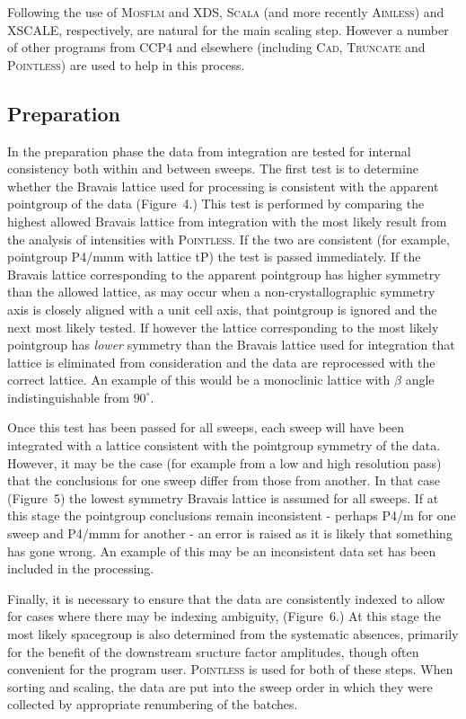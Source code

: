 \documentclass[preprint,pdf]{iucr}
\begin{document}
Following the use of \textsc{Mosflm} and XDS, \textsc{Scala} 
(and more recently \textsc{Aimless}) and
XSCALE, respectively, 
are natural for the main scaling step. However a number of other
programs from CCP4 and elsewhere (including \textsc{Cad}, 
\textsc{Truncate} and
\textsc{Pointless}) are used to help in this process.

\subsection{Preparation}

In the preparation phase the data from integration are tested for
internal consistency both within and between sweeps. The first test is
to determine whether the Bravais lattice used for processing is
consistent with the apparent pointgroup of the data
(Figure~4.)
This test is performed by comparing the highest allowed Bravais
lattice from integration with the most likely result from 
the analysis of intensities with \textsc{Pointless}. If
the two are consistent (for example, pointgroup P4/mmm with lattice tP)
the test is passed immediately. If the Bravais lattice corresponding
to the apparent pointgroup has higher
symmetry than the allowed lattice, as may occur when a
non-crystallographic symmetry axis is closely aligned with a unit cell
axis, that pointgroup is ignored and the next most likely tested. 
If however the lattice corresponding to the most likely pointgroup has 
\emph{lower} symmetry than the
Bravais lattice used for integration that lattice is eliminated from
consideration and the data are reprocessed with the correct lattice.
An example of this would
be a monoclinic lattice with $\beta$ angle indistinguishable
from $90^{\circ}$. 

Once this test has been passed for all sweeps, each sweep will have been
integrated with a lattice consistent with the pointgroup symmetry of
the data. However, it may be the case (for example from a low and high
resolution pass) that the conclusions for one sweep differ from those
from another. In that case (Figure~5) the lowest
symmetry Bravais lattice
is assumed for all sweeps. If at this stage the pointgroup
conclusions remain inconsistent - perhaps P4/m for one sweep and 
P4/mmm for another - an error is raised as it is likely
that something has gone wrong. An example of this may be an
inconsistent data set has been included in the processing. 

Finally, it is necessary to ensure that the data are consistently
indexed to allow for cases where there may be indexing ambiguity,
(Figure~6.) At this stage the most likely
spacegroup is also determined from the systematic absences, primarily
for the benefit of the downstream sructure factor amplitudes, though
often convenient for the program user. \textsc{Pointless} is used for
both of these steps. When sorting and scaling, the
data are put into the sweep order in which they were collected by
appropriate renumbering of the batches.
\end{document}
